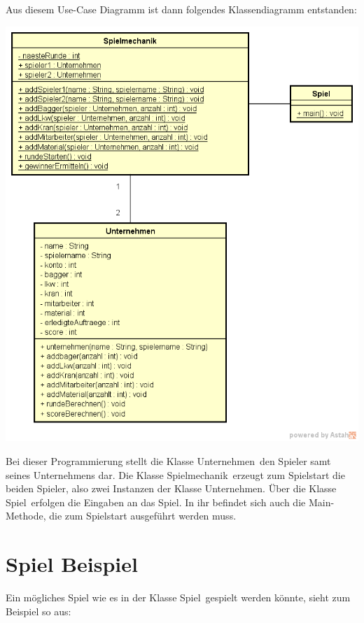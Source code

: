 Aus diesem Use-Case Diagramm ist dann folgendes Klassendiagramm entstanden:

\begin{minipage}{\linewidth}
	\centering
	\includegraphics[scale=0.63]{img/ClassDiagramPrototypeFallstudie.png}
	\vspace{2em}
\end{minipage}

Bei dieser Programmierung stellt die Klasse \glqq Unternehmen\grqq \ den Spieler samt seines Unternehmens dar. Die Klasse \glqq Spielmechanik\grqq \ erzeugt zum Spielstart die beiden Spieler, also zwei Instanzen der Klasse \glqq Unternehmen\grqq . Über die Klasse \glqq Spiel\grqq \ erfolgen die Eingaben an das Spiel. In ihr befindet sich auch die Main-Methode, die zum Spielstart ausgeführt werden muss. 

\section{Spiel Beispiel}

Ein mögliches Spiel wie es in der Klasse \glqq Spiel\grqq \ gespielt werden könnte, sieht zum Beispiel so aus:

